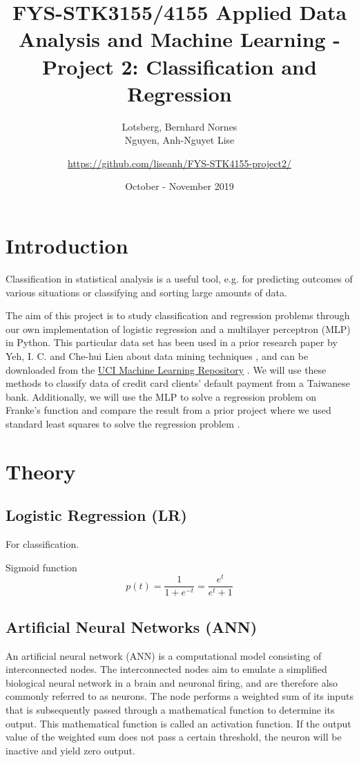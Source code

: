 \documentclass[a4paper, 11pt, twocolumn]{article}
\title{FYS-STK3155/4155 Applied Data Analysis and Machine Learning - Project 2: Classification and Regression }
\author{Lotsberg, Bernhard Nornes \\ Nguyen, Anh-Nguyet Lise \and \url{https://github.com/liseanh/FYS-STK4155-project2/}}
\date{October - November 2019}
\begin{document}

\section{Introduction}
Classification in statistical analysis is a useful tool, e.g. for predicting outcomes of various situations or classifying and sorting large amounts of data. 

The aim of this project is  to study classification and regression problems through our own implementation of logistic regression and a multilayer perceptron (MLP) in Python. This particular data set has been used in a prior research paper by Yeh, I. C. and Che-hui Lien about data mining techniques \cite{origarticle}, and can be downloaded from the \href{https://archive.ics.uci.edu/ml/datasets/default+of+credit+card+clients}{UCI Machine Learning Repository} \cite{UCI}.
We will use these methods to classify data of credit card clients' default payment from a Taiwanese bank. Additionally, we will use the MLP to solve a regression problem on Franke's function and compare the result from a prior project where we used standard least squares to solve the regression problem \cite{regpaper}.  


\section{Theory}

\subsection{Logistic Regression (LR)}
For classification.

Sigmoid function
\begin{equation}
p(t) = \frac{1}{1 + e^{-t}} =\frac{e^t}{e^t+1}
\end{equation}

\subsection{Artificial Neural Networks (ANN)}
An artificial neural network (ANN) is a computational model consisting of interconnected nodes. The interconnected nodes aim to emulate a simplified biological neural network in a brain  and neuronal firing, and are therefore also commonly referred to as neurons.  The node performs a weighted sum of its inputs that is subsequently passed through a mathematical function to determine its output. This mathematical function is called an activation function. If the output value of the weighted sum does not pass a certain threshold, the neuron will be inactive and yield zero output. 
\end{document}
